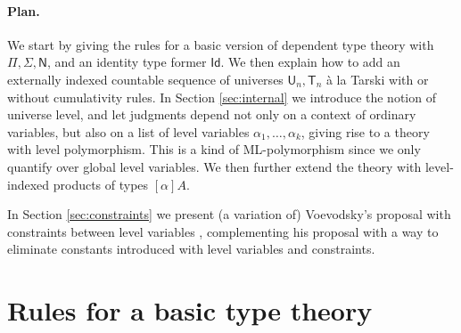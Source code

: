 \documentclass[11pt,a4paper]{article}
\theoremstyle{definition}
\newcommand{\Id}{\mathsf{Id}}
\def\NN{\mathsf{N}}
\def\UU{\mathsf{U}}
\def\Level{\mathsf{Level}}
\newcommand{\T}{\mathsf{T}}
\begin{document}



\paragraph{Plan.} We start by giving the rules for a basic version of dependent type theory with
$\Pi, \Sigma, \NN$, and an identity type former $\Id$.
We then explain how to add an externally indexed countable sequence of universes $\UU_n, \T_n$ \`a la Tarski with or without
cumulativity rules.
In Section \ref{sec:internal} we introduce the notion of universe level, and let judgments depend not only on a context of ordinary variables, but also on a list of level variables $\alpha_1, \ldots, \alpha_k$, giving rise to a theory with level polymorphism. This is a kind of ML-polymorphism since we only quantify over global level variables. We then further extend the theory with level-indexed products of types $[\alpha]A$.

In Section \ref{sec:constraints} we present (a variation of) Voevodsky's proposal with constraints between level variables  \cite{VV}, complementing his proposal with a way to eliminate constants introduced with level variables and constraints.

\section{Rules for a basic type theory}
\end{document}
